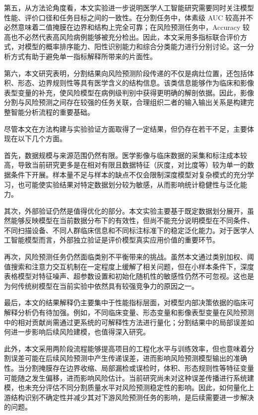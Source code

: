 第五，从方法论角度看，本文实验进一步说明医学人工智能研究需要同时关注模型性能、评价口径和任务目标之间的一致性。在分割任务中，体素级 AUC 较高并不必然意味着二值掩膜在边界和结构上完全可靠；在风险预测任务中，Accuracy 较高也不必然代表高风险病例能够被充分检出。因此，本文采用多指标联合评价方式，对模型的概率排序能力、阳性识别能力和综合分类能力进行分别讨论。这一分析方式有助于避免单一指标解释所带来的片面性。

第六，本文研究表明，分割结果向风险预测阶段传递的不仅是病灶位置，还包括体积、形态、边界规则性等具有医学含义的结构信息。该类信息能够作为临床和影像表型变量的补充，使风险模型在病例级判别中获得更明确的解剖依据。因此，影像分割与风险预测之间存在较强的任务关联，合理组织二者的输入输出关系是构建完整智能分析流程的重要基础。

尽管本文在方法构建与实验验证方面取得了一定结果，但仍存在若干不足，主要体现在以下几个方面。

首先，数据规模与来源范围仍然有限。医学影像与临床数据的采集和标注成本较高，导致当前研究更多是在相对有限且数据特征（灰度，对比度等）较为单一的数据条件下开展。样本量不足与样本的缺点不仅会限制深度模型对复杂模式的充分学习，也可能使实验结果对特定数据划分较为敏感，从而影响统计稳健性与泛化能力。

其次，外部验证仍然是值得优化的部分。本文实验主要基于既定数据划分展开，虽然能够反映模型在当前数据分布下的有效性，但尚不能充分说明模型在不同条件、不同扫描设备、不同人群临床信息和不同标注标准下的稳定泛化能力。对于医学人工智能模型而言，外部独立验证是评价模型真实应用价值的重要环节。

再次，风险预测任务仍然面临类别不平衡带来的挑战。虽然本文通过类别加权、阈值搜索和注意力交互机制在一定程度上缓解了相关问题，但在小样本条件下，深度表格模型对特征噪声、超参数设置和初始化随机性的敏感性仍然不可忽视。这也是为何传统树模型在当前实验中依然具有较强竞争力的原因之一。

最后，本文的结果解释仍主要集中于性能指标层面，对模型内部决策依据的临床可解释分析仍有待加强。例如，不同临床变量、形态变量和影像表型变量在风险预测中的相对贡献尚需通过更系统的可解释性方法进行量化；分割结果中的局部误差如何进一步影响后续风险建模，也值得深入研究。

此外，本文采用两阶段流程能够提高项目的工程化水平与训练效率，但也意味着分割误差可能在后续风险预测中产生传递误差，进而影响风险预测模型输出的准确性。当分割掩膜存在边界收缩、局部漏检或误检时，体积、形态规则性等特征变量可能随之发生偏移，进而影响风险估计。当前研究尚未对这种误差传播进行系统建模，也未充分评估不同分割质量水平对风险预测稳定性的影响。因此，如何量化上游结构识别不确定性并减少其对下游风险预测任务的影响，是后续需要进一步解决的问题。

